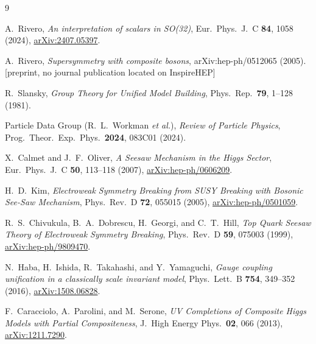 \documentclass[%
 aps,
 prd,
 reprint,
 nofootinbib,
 superscriptaddress,
 amsmath,
 amssymb,
]{revtex4-2}
\begin{document}
\begin{thebibliography}{9}

A.~Rivero,
\emph{An interpretation of scalars in SO(32)},
Eur.\ Phys.\ J.\ C \textbf{84}, 1058 (2024),
\href{https://arxiv.org/abs/2407.05397}{arXiv:2407.05397}.

A.~Rivero,
\emph{Supersymmetry with composite bosons},
arXiv:hep-ph/0512065 (2005).
[preprint, no journal publication located on InspireHEP]

R.~Slansky,
\emph{Group Theory for Unified Model Building},
Phys.\ Rep.\ \textbf{79}, 1--128 (1981).

Particle Data Group (R.~L.~Workman \emph{et al.}),
\emph{Review of Particle Physics},
Prog.\ Theor.\ Exp.\ Phys.\ \textbf{2024}, 083C01 (2024).

X.~Calmet and J.~F.~Oliver,
\emph{A Seesaw Mechanism in the Higgs Sector},
Eur.\ Phys.\ J.\ C \textbf{50}, 113--118 (2007),
\href{https://arxiv.org/abs/hep-ph/0606209}{arXiv:hep-ph/0606209}.

H.~D.~Kim,
\emph{Electroweak Symmetry Breaking from SUSY Breaking with Bosonic See-Saw Mechanism},
Phys.\ Rev.\ D \textbf{72}, 055015 (2005),
\href{https://arxiv.org/abs/hep-ph/0501059}{arXiv:hep-ph/0501059}.

R.~S.~Chivukula, B.~A.~Dobrescu, H.~Georgi, and C.~T.~Hill,
\emph{Top Quark Seesaw Theory of Electroweak Symmetry Breaking},
Phys.\ Rev.\ D \textbf{59}, 075003 (1999),
\href{https://arxiv.org/abs/hep-ph/9809470}{arXiv:hep-ph/9809470}.

N.~Haba, H.~Ishida, R.~Takahashi, and Y.~Yamaguchi,
\emph{Gauge coupling unification in a classically scale invariant model},
Phys.\ Lett.\ B \textbf{754}, 349--352 (2016),
\href{https://arxiv.org/abs/1508.06828}{arXiv:1508.06828}.

F.~Caracciolo, A.~Parolini, and M.~Serone,
\emph{UV Completions of Composite Higgs Models with Partial Compositeness},
J.\ High Energy Phys.\ \textbf{02}, 066 (2013),
\href{https://arxiv.org/abs/1211.7290}{arXiv:1211.7290}.

\end{thebibliography}
\end{document}
